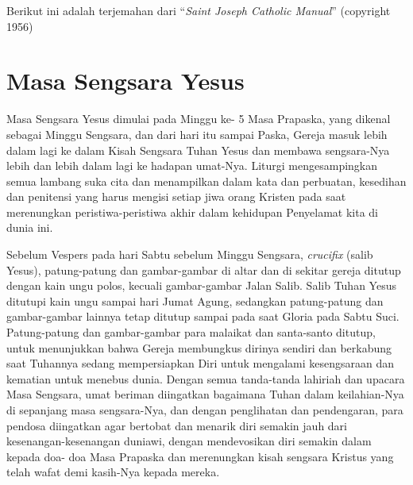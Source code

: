 
Berikut ini adalah terjemahan dari ``\textit{Saint Joseph Catholic Manual}'' (copyright 1956)

\section*{Masa Sengsara Yesus}

Masa Sengsara Yesus dimulai pada Minggu ke- 5 Masa Prapaska, yang dikenal sebagai Minggu Sengsara, dan dari hari itu sampai Paska, Gereja masuk lebih dalam lagi ke dalam Kisah Sengsara Tuhan Yesus dan membawa sengsara-Nya lebih dan lebih dalam lagi ke hadapan umat-Nya. Liturgi mengesampingkan semua lambang suka cita dan menampilkan dalam kata dan perbuatan, kesedihan dan penitensi yang harus mengisi setiap jiwa orang Kristen pada saat merenungkan peristiwa-peristiwa akhir dalam kehidupan Penyelamat kita di dunia ini.

Sebelum Vespers pada hari Sabtu sebelum Minggu Sengsara, \textit{crucifix} (salib Yesus), patung-patung dan gambar-gambar di altar dan di sekitar gereja ditutup dengan kain ungu polos, kecuali gambar-gambar Jalan Salib. Salib Tuhan Yesus ditutupi kain ungu sampai hari Jumat Agung, sedangkan patung-patung dan gambar-gambar lainnya tetap ditutup sampai pada saat Gloria pada Sabtu Suci. Patung-patung dan gambar-gambar para malaikat dan santa-santo ditutup, untuk menunjukkan bahwa Gereja membungkus dirinya sendiri dan berkabung saat Tuhannya sedang mempersiapkan Diri untuk mengalami kesengsaraan dan kematian untuk menebus dunia. Dengan semua tanda-tanda lahiriah dan upacara Masa Sengsara, umat beriman diingatkan bagaimana Tuhan dalam keilahian-Nya di sepanjang masa sengsara-Nya, dan dengan penglihatan dan pendengaran, para pendosa diingatkan agar bertobat dan menarik diri semakin jauh dari kesenangan-kesenangan duniawi, dengan mendevosikan diri semakin dalam kepada doa- doa Masa Prapaska dan merenungkan kisah sengsara Kristus yang telah wafat demi kasih-Nya kepada mereka.
